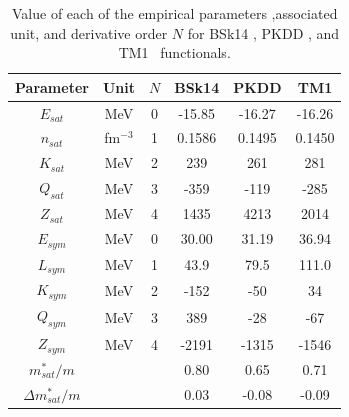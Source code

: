 \begin{table}[!t]
\begin{center}
\begin{tabular}{cccccc} 
  \toprule
  \toprule
  Parameter & Unit & $N$ & BSk14 & PKDD & TM1\\
  \midrule
  $E_{sat}$ & MeV & 0         & -15.85 & -16.27  & -16.26 \\
  $n_{sat}$ & fm$^{-3}$ & 1   & 0.1586 &  0.1495 & 0.1450 \\ 
  $K_{sat}$ & MeV & 2         & 239    &  261    & 281    \\ 
  $Q_{sat}$ & MeV & 3         & -359   &  -119   & -285   \\ 
  $Z_{sat}$ & MeV & 4         & 1435   &  4213   & 2014   \\ 
  $E_{sym}$ & MeV & 0         & 30.00  &  31.19  & 36.94  \\
  $L_{sym}$ & MeV & 1         & 43.9   &  79.5   & 111.0  \\
  $K_{sym}$ & MeV & 2         & -152   &  -50    & 34     \\
  $Q_{sym}$ & MeV & 3         & 389    &  -28    & -67    \\
  $Z_{sym}$ & MeV & 4         & -2191  &  -1315  & -1546  \\
  $m_{sat}^*/m$ & &           & 0.80   &  0.65   & 0.71   \\
  $\Delta m_{sat}^*/m$ & &    & 0.03   &  -0.08  & -0.09  \\
  \bottomrule
  \bottomrule
\end{tabular}
\end{center}
\caption[Empirical parameters for BSk14, PKDD, and TM1]{Value of each of the 
  empirical parameters ,associated unit, and derivative order $N$ for BSk14 
  \cite{Goriely2007}, PKDD \cite{Long2004}, and TM1~\cite{Sumiyoshi1995} 
functionals.}\label{table:newemppar}
\end{table}


